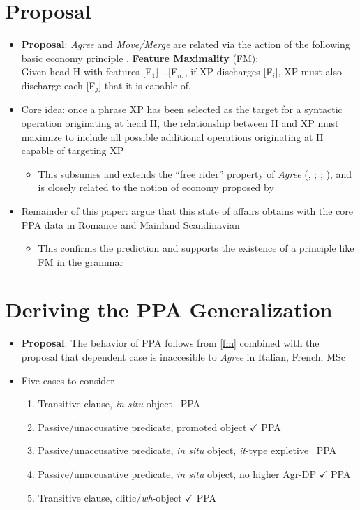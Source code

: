 \documentclass[letterpaper,10pt]{handout_nick}
\begin{document}
\section{Proposal}
\begin{itemize}
\item \textbf{Proposal}: \emph{Agree} and \emph{Move/Merge} are related via the action of the following basic economy principle 
\ex.\label{fm} \textbf{Feature Maximality} (FM):\\
Given head H with features [F$_1$] \ldots [F$_n$], if XP discharges [F$_i$], XP must also discharge each [F$_j$] that it is capable of.

\item Core idea: once a phrase XP has been selected as the target for a syntactic operation originating at head H, the relationship between H and XP must maximize to include all possible additional operations originating at H capable of targeting XP
\begin{itemize}
\item This subsumes and extends the ``free rider'' property of \emph{Agree} (\citealt{chomsky95}, \citeyear{chomsky01}; \citealt{bruening01}; \citealt{rezac13}), and is closely related to the notion of economy proposed by \citet{pesetsky01}
\end{itemize}
\item Remainder of this paper: argue that this state of affairs obtains with the core PPA data in Romance and Mainland Scandinavian
\begin{itemize}
\item This confirms the prediction and supports the existence of a principle like FM in the grammar
\end{itemize} 
\end{itemize}
\section{Deriving the PPA Generalization}
\begin{itemize}
\item \textbf{Proposal}: The behavior of PPA follows from \ref{fm} combined with the proposal that dependent case is inaccesible to \emph{Agree} in Italian, French, MSc
\item Five cases to consider
\begin{enumerate}[noitemsep]
\item Transitive clause, \emph{in situ} object \hfill \xmark\ PPA 
\item Passive/unaccusative predicate, promoted object \hfill $\checkmark$ PPA 
\item Passive/unaccusative predicate, \emph{in situ} object, \emph{it}-type expletive \hfill \xmark\ PPA 
\item Passive/unaccusative predicate, \emph{in situ} object, no higher Agr-DP \hfill $\checkmark$ PPA 
\item Transitive clause, clitic/\emph{wh}-object \hfill $\checkmark$ PPA
\end{enumerate}
\end{itemize}
\end{document}
